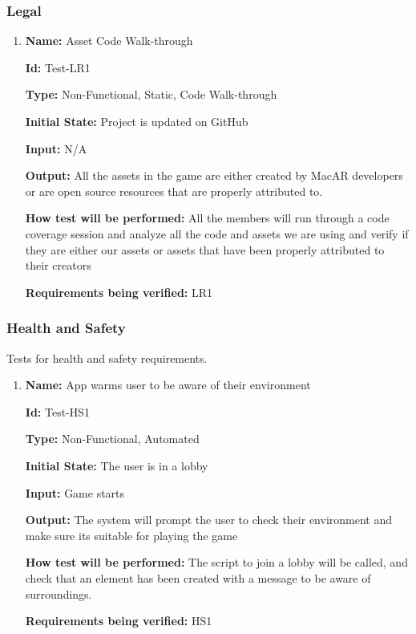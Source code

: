 \documentclass[12pt, titlepage]{article}
\begin{document}
\subsubsection{Legal}

\begin{enumerate}

\item{\textbf{Name:} Asset Code Walk-through} \label{itm:Test-LR1}

\textbf{Id:} Test-LR1

\textbf{Type:} Non-Functional, Static, Code Walk-through
					
\textbf{Initial State:} Project is updated on GitHub
					
\textbf{Input:} N/A
					
\textbf{Output:} All the assets in the game are either created by MacAR developers or are open source resources that are properly attributed to. 
					
\textbf{How test will be performed:} All the members will run through a code coverage session and analyze all the code and assets we are using and verify if they are either our assets or assets that have been properly attributed to their creators

\textbf{Requirements being verified:} LR1
					
\end{enumerate}

\subsubsection{Health and Safety}
Tests for health and safety requirements. 

\begin{enumerate}

\item{\textbf{Name:} App warms user to be aware of their environment} \label{itm:Test-HS1}

\textbf{Id:} Test-HS1

\textbf{Type:} Non-Functional, Automated
					
\textbf{Initial State:} The user is in a lobby
					
\textbf{Input:} Game starts
					
\textbf{Output:} The system will prompt the user to check their environment and make sure its suitable for playing the game
					
\textbf{How test will be performed:} The script to join a lobby will be called, and check that an element has been created with a message to be aware of surroundings. 

\textbf{Requirements being verified:} HS1
\end{enumerate}
\end{document}
